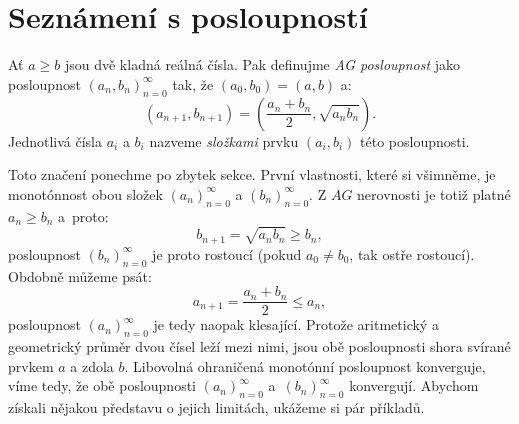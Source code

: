 \documentclass[12pt]{report}
\begin{document}
\section{Seznámení s posloupností}


\begin{definice}
Ať $a \geqslant b$ jsou dvě kladná reálná čísla. Pak definujme \textit{AG posloupnost} jako posloupnost $(a_n,b_n)_{n=0}^{\infty}$ tak, že $(a_0,b_0) = (a,b)$ a:
$$\left(a_{n+1},b_{n+1} \right) = \left(\frac{a_n+b_n}{2}, \sqrt{a_n b_n} \right).$$
Jednotlivá čísla $a_i$ a $b_i$ nazveme \textit{složkami} prvku $(a_i,b_i)$ této posloupnosti.
\end{definice}

Toto značení ponechme po zbytek sekce. První vlastnosti, které si všimněme, je monotónnost obou složek $(a_n)_{n=0}^{\infty}$ a $(b_n)_{n=0}^{\infty}$. Z $AG$ nerovnosti je totiž platné $a_n \geqslant b_n$ a~proto:
$$ b_{n+1} = \sqrt{a_n b_n} \geqslant b_n,$$
posloupnost $(b_n)_{n=0}^{\infty}$ je proto rostoucí (pokud $a_0 \neq b_0$, tak ostře rostoucí). Obdobně  můžeme psát:
$$a_{n+1} = \frac{a_n+b_n}{2} \leqslant a_n,$$
posloupnost $(a_n)_{n=0}^{\infty}$ je tedy naopak klesající. Protože aritmetický a geometrický průměr dvou čísel leží mezi nimi, jsou obě posloupnosti shora svírané prvkem $a$ a zdola $b$. Libovolná ohraničená monotónní posloupnost konverguje, víme tedy, že obě posloupnosti $(a_n)_{n=0}^{\infty}$ a~$(b_n)_{n=0}^{\infty}$ konvergují. Abychom získali nějakou představu o jejich limitách, ukážeme si pár příkladů.
\end{document}

